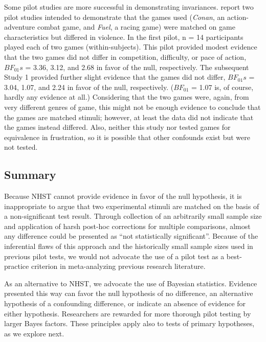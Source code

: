 \documentclass[fignum,nobf,man]{apa}
\begin{document}
Some pilot studies are more successful in demonstrating invariances. \citet{Adachi:Willoughby:2011} report two pilot studies intended to demonstrate that the games used ({\em Conan}, an action-adventure combat game, and {\em Fuel}, a racing game) were matched on game characteristics but differed in violence. In the first pilot, n = 14 participants played each of two games (within-subjects). This pilot provided modest evidence that the two games did not differ in competition, difficulty, or pace of action, $BF_{01}s$ = 3.36, 3.12, and 2.68 in favor of the null, respectively. The subsequent Study 1 provided further slight evidence that the games did not differ, $BF_{01}s$ = 3.04, 1.07, and 2.24 in favor of the null, respectively. ($BF_{01}$ = 1.07 is, of course, hardly any evidence at all.) Considering that the two games were, again, from very different genres of game, this might not be enough evidence to conclude that the games are matched stimuli; however, at least the data did not indicate that the games instead differed. Also, neither this study nor \citet{Valadez:Ferguson:2012} tested games for equivalence in frustration, so it is possible that other confounds exist but were not tested.

\subsection{Summary}
Because NHST cannot provide evidence in favor of the null hypothesis, it is inappropriate to argue that two experimental stimuli are matched on the basis of a non-significant test result. Through collection of an arbitrarily small sample size and application of harsh post-hoc corrections for multiple comparisons, almost any difference could be presented as ``not statistically significant''. Because of the inferential flaws of this approach and the historically small sample sizes used in previous pilot tests, we would not advocate the use of a pilot test as a best-practice criterion in meta-analyzing previous research literature.
 
As an alternative to NHST, we advocate the use of Bayesian statistics. Evidence presented this way can favor the null hypothesis of no difference, an alternative hypothesis of a confounding difference, or indicate an absence of evidence for either hypothesis. Researchers are rewarded for more thorough pilot testing by larger Bayes factors. These principles apply also to tests of primary hypotheses, as we explore next.
\end{document}
